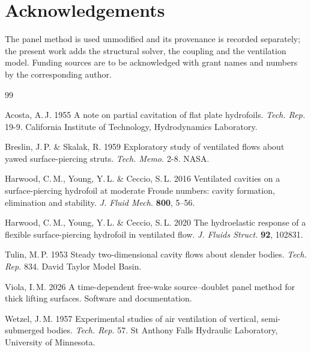 \documentclass[11pt,a4paper]{article}
\begin{document}
\section*{Acknowledgements}

The panel method is used unmodified and its provenance is recorded separately;
the present work adds the structural solver, the coupling and the ventilation
model. Funding sources are to be acknowledged with grant names and numbers by the
corresponding author.

\begin{thebibliography}{99}

Acosta, A.\,J. 1955
A note on partial cavitation of flat plate hydrofoils.
\emph{Tech. Rep.} 19-9. California Institute of Technology, Hydrodynamics
Laboratory.

Breslin, J.\,P. \& Skalak, R. 1959
Exploratory study of ventilated flows about yawed surface-piercing struts.
\emph{Tech. Memo.} 2-8. NASA.

Harwood, C.\,M., Young, Y.\,L. \& Ceccio, S.\,L. 2016
Ventilated cavities on a surface-piercing hydrofoil at moderate Froude numbers:
cavity formation, elimination and stability.
\emph{J. Fluid Mech.} \textbf{800}, 5--56.

Harwood, C.\,M., Young, Y.\,L. \& Ceccio, S.\,L. 2020
The hydroelastic response of a flexible surface-piercing hydrofoil in
ventilated flow.
\emph{J. Fluids Struct.} \textbf{92}, 102831.

Tulin, M.\,P. 1953
Steady two-dimensional cavity flows about slender bodies.
\emph{Tech. Rep.} 834. David Taylor Model Basin.

Viola, I.\,M. 2026
A time-dependent free-wake source--doublet panel method for thick lifting
surfaces. Software and documentation.

Wetzel, J.\,M. 1957
Experimental studies of air ventilation of vertical, semi-submerged bodies.
\emph{Tech. Rep.} 57. St Anthony Falls Hydraulic Laboratory, University of
Minnesota.

\end{thebibliography}
\end{document}
